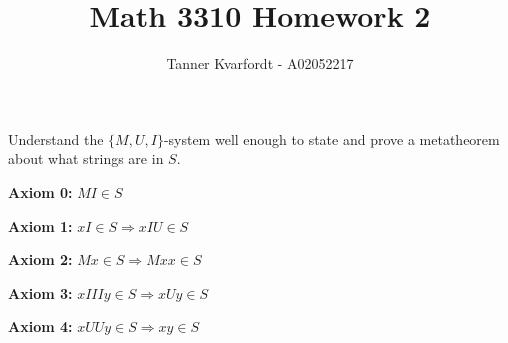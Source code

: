 \documentclass[12pt]{article}
\newenvironment{problem}[2][Problem]{\begin{trivlist}
\item[\hskip \labelsep {\bfseries #1}\hskip \labelsep {\bfseries #2.}]}{\end{trivlist}}
\begin{document}
 
\title{Math 3310 Homework 2}
\author{Tanner Kvarfordt - A02052217}
\maketitle
 
\begin{problem}[Formal Systems Prompt]{1}
Understand the $\{M,U,I\}$-system well enough to state and prove a metatheorem about what strings are in $S$.
\begin{description}
\item \textbf{Axiom 0:} $MI \in S$
\item \textbf{Axiom 1:} $xI \in S \Longrightarrow xIU \in S$
\item \textbf{Axiom 2:} $Mx \in S \Longrightarrow Mxx \in S$
\item \textbf{Axiom 3:} $xIIIy \in S \Longrightarrow xUy \in S$
\item \textbf{Axiom 4:} $xUUy \in S \Longrightarrow xy \in S$
\end{description}
\end{problem}
 
\end{document}
